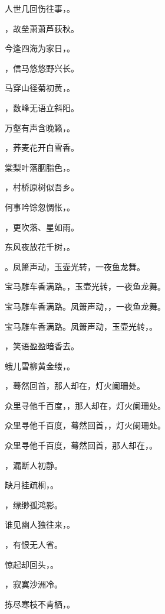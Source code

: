 \documentclass[12pt, a4paper, addpoints]{exam}
\begin{document}
\begin{questions}
\question[3] 人世几回伤往事，\fillin。

\question[3] \fillin，故垒萧萧芦荻秋。

\question[3] 今逢四海为家日，\fillin。

\question[3] \fillin，信马悠悠野兴长。

\question[3] 马穿山径菊初黄，\fillin。

\question[3] \fillin，数峰无语立斜阳。

\question[3] 万壑有声含晚籁，\fillin。

\question[3] \fillin，荞麦花开白雪香。

\question[3] 棠梨叶落胭脂色，\fillin。

\question[3] \fillin，村桥原树似吾乡。

\question[3] 何事吟馀忽惆怅，\fillin。

\question[3] \fillin，更吹落、星如雨。

\question[3] 东风夜放花千树，\fillin。

\question[3] \fillin。凤箫声动，玉壶光转，一夜鱼龙舞。

\question[3] 宝马雕车香满路。\fillin，玉壶光转，一夜鱼龙舞。

\question[3] 宝马雕车香满路。凤箫声动，\fillin，一夜鱼龙舞。

\question[3] 宝马雕车香满路。凤箫声动，玉壶光转，\fillin。

\question[3] \fillin，笑语盈盈暗香去。

\question[3] 蛾儿雪柳黄金缕，\fillin。

\question[3] \fillin，蓦然回首，那人却在，灯火阑珊处。

\question[3] 众里寻他千百度，\fillin，那人却在，灯火阑珊处。

\question[3] 众里寻他千百度，蓦然回首，\fillin，灯火阑珊处。

\question[3] 众里寻他千百度，蓦然回首，那人却在，\fillin。

\question[3] \fillin，漏断人初静。

\question[3] 缺月挂疏桐，\fillin。

\question[3] \fillin，缥缈孤鸿影。

\question[3] 谁见幽人独往来，\fillin。

\question[3] \fillin，有恨无人省。

\question[3] 惊起却回头，\fillin。

\question[3] \fillin，寂寞沙洲冷。

\question[3] 拣尽寒枝不肯栖，\fillin。


\end{questions}
\end{document}
